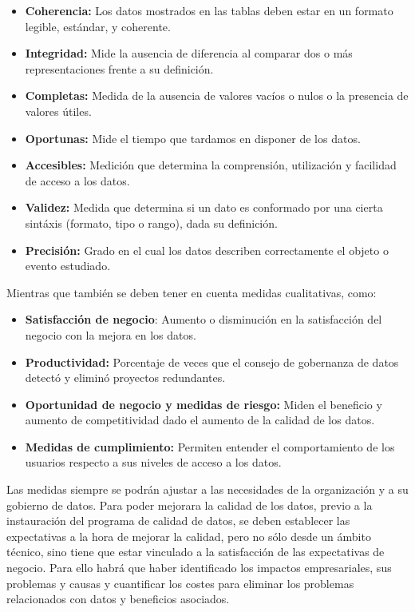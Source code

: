 \documentclass{article}
\begin{document}
\begin{itemize}
\item \textbf{Coherencia:} Los datos mostrados en las tablas deben estar en un formato legible, estándar, y coherente.
\item \textbf{Integridad:} Mide la ausencia de diferencia al comparar dos o más representaciones frente a su definición.
\item \textbf{Completas:} Medida de la ausencia de valores vacíos o nulos o la presencia de valores útiles.
\item \textbf{Oportunas:} Mide el tiempo que tardamos en disponer de los datos.
\item \textbf{Accesibles:} Medición que determina la comprensión, utilización y facilidad de acceso a los datos.
\item \textbf{Validez:} Medida que determina si un dato es conformado por una cierta sintáxis (formato, tipo o rango), dada su definición.
\item \textbf{Precisión:} Grado en el cual los datos describen correctamente el objeto o evento estudiado.
\end{itemize}

Mientras que también se deben tener en cuenta medidas cualitativas, como:
\begin{itemize}
\item \textbf{Satisfacción de negocio}: Aumento o disminución en la satisfacción del negocio con la mejora en los datos.
\item \textbf{Productividad:} Porcentaje de veces que el consejo de gobernanza de datos detectó y eliminó proyectos redundantes.
\item \textbf{Oportunidad de negocio y medidas de riesgo:} Miden el beneficio y aumento de competitividad dado el aumento de la calidad de los datos.
\item \textbf{Medidas de cumplimiento:} Permiten entender el comportamiento de los usuarios respecto a sus niveles de acceso a los datos.
\end{itemize}

Las medidas siempre se podrán ajustar a las necesidades de la organización y a su gobierno de datos. Para poder mejorara la calidad de los datos, previo a la instauración del programa de calidad de datos, se deben establecer las expectativas a la hora de mejorar la calidad, pero no sólo desde un ámbito técnico, sino tiene que estar vinculado a la satisfacción de las expectativas de negocio. Para ello habrá que haber identificado los impactos empresariales, sus problemas y causas y cuantificar los costes para eliminar los problemas relacionados con datos y beneficios asociados.
\end{document}
